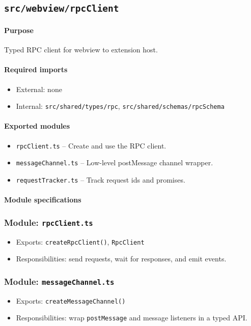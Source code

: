 \documentclass[11pt]{article}
\begin{document}
\subsection{\texttt{src/webview/rpcClient}}
\paragraph{Purpose} Typed RPC client for webview to extension host.

\paragraph{Required imports}
\begin{itemize}[noitemsep]
  \item External: none
  \item Internal: \texttt{src/shared/types/rpc}, \texttt{src/shared/schemas/rpcSchema}
\end{itemize}

\paragraph{Exported modules}
\begin{itemize}[noitemsep]
  \item \texttt{rpcClient.ts} -- Create and use the RPC client.
  \item \texttt{messageChannel.ts} -- Low-level postMessage channel wrapper.
  \item \texttt{requestTracker.ts} -- Track request ids and promises.
\end{itemize}

\paragraph{Module specifications}
\subsubsection*{Module: \texttt{rpcClient.ts}}
\begin{itemize}[noitemsep]
  \item Exports: \texttt{createRpcClient()}, \texttt{RpcClient}
  \item Responsibilities: send requests, wait for responses, and emit events.
\end{itemize}

\subsubsection*{Module: \texttt{messageChannel.ts}}
\begin{itemize}[noitemsep]
  \item Exports: \texttt{createMessageChannel()}
  \item Responsibilities: wrap \texttt{postMessage} and message listeners in a typed API.
\end{itemize}
\end{document}
